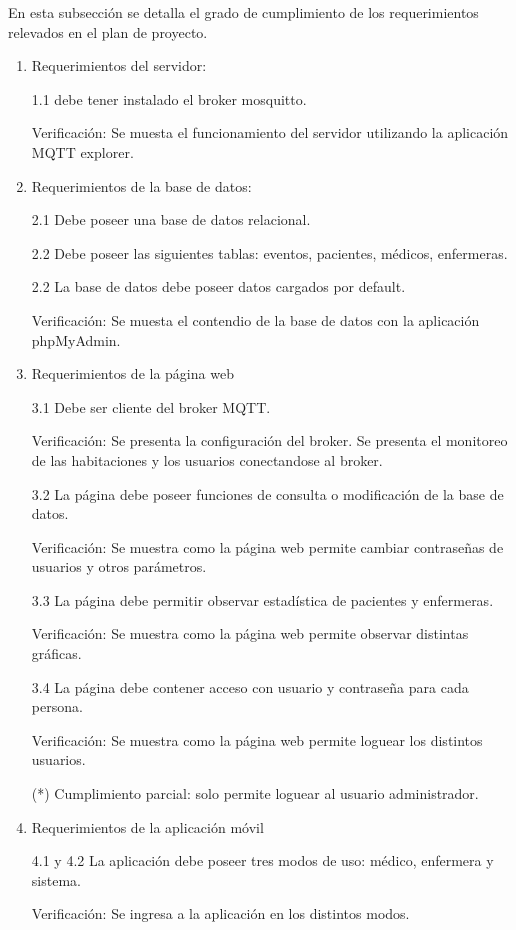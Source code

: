 En esta subsección se detalla el grado de cumplimiento de los requerimientos relevados en el plan de proyecto.
\begin{enumerate}
\item Requerimientos del servidor: 

1.1 debe tener instalado el broker mosquitto.

Verificación: Se muesta el funcionamiento del servidor utilizando la aplicación MQTT explorer.

\item Requerimientos de la base de datos: 

2.1 Debe poseer una base de datos relacional. 

2.2 Debe poseer las siguientes tablas: eventos, pacientes, médicos, enfermeras. 

2.2 La base de datos debe poseer datos cargados por default.

Verificación: Se muesta el contendio de la base de datos con la aplicación phpMyAdmin.

\item Requerimientos de la página web 

3.1 Debe ser cliente del broker MQTT. 

Verificación: Se presenta la configuración del broker. Se presenta el monitoreo de las habitaciones y los usuarios conectandose al broker.

3.2 La página debe poseer funciones de consulta o modificación de la base de datos.

Verificación: Se muestra como la página web permite cambiar contraseñas de usuarios y otros parámetros.

3.3 La página debe permitir observar estadística de pacientes y enfermeras.

Verificación: Se muestra como la página web permite observar distintas gráficas.

3.4 La página debe contener acceso con usuario y contraseña para cada persona.


Verificación: Se muestra como la página web permite loguear los distintos usuarios.
 
(*) Cumplimiento parcial: solo permite loguear al usuario administrador.

\item Requerimientos de la aplicación móvil

4.1 y 4.2 La aplicación debe poseer tres modos de uso: médico, enfermera y sistema. 

Verificación: Se ingresa a la aplicación en los distintos modos.


\end{enumerate}
